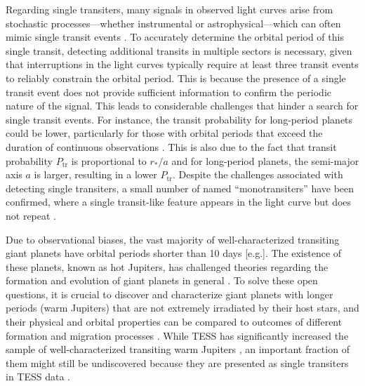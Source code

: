 Regarding single transiters, many signals in observed light curves arise from stochastic processes—whether instrumental or astrophysical—which can often mimic single transit events \citep{foreman2016population}. To accurately determine the orbital period of this single transit, detecting additional transits in multiple sectors is necessary, given that interruptions in the light curves typically require at least three transit events to reliably constrain the orbital period. This is because the presence of a single transit event does not provide sufficient information to confirm the periodic nature of the signal. This leads to considerable challenges that hinder a search for single transit events. For instance, the transit probability for long-period planets could be lower, particularly for those with orbital periods that exceed the duration of continuous observations \citep{hawthorn2024tess}. This is also due to the fact that transit probability $P_{\mathrm{tr}}$ is proportional to ${r_\ast}/a$ and for long-period planets, the semi-major axis $a$ is larger, resulting in a lower $P_{\mathrm{tr}}$. Despite the challenges associated with detecting single transiters, a small number of named ``monotransiters'' have been confirmed, where a single transit-like feature appears in the light curve but does not repeat \citep{gill2020ngts1, gill2020ngts2, lendl2020toi}.  \par


Due to observational biases, the vast majority of well-characterized transiting giant planets have orbital periods shorter than 10 days [e.g.]\citep{hartman:2019, magliano2023tess}. The existence of these planets, known as hot Jupiters, has challenged theories regarding the formation and evolution of giant planets in general \citep{pollack:96}. To solve these open questions, it is crucial to discover and characterize giant planets with longer periods (warm Jupiters) that are not extremely irradiated by their host stars, and their physical and orbital properties can be compared to outcomes of different formation and migration processes \citep{dawson:2018}. While TESS has significantly increased the sample of well-characterized transiting warm Jupiters \citep[e.g.][]{dawson:2021,grieves:2022,brahm:2023,battley:2024}, an important fraction of them might still be undiscovered because they are presented as single transiters in TESS data \citep[e.g.][]{gill:2020}. \par


